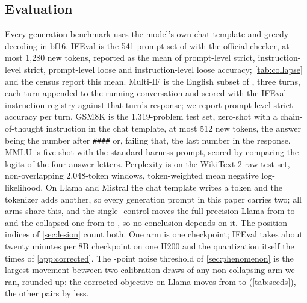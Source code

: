\subsection{Evaluation}
Every generation benchmark uses the model's own chat template and greedy decoding in bf16.
IFEval is the 541-prompt set of \citet{zhou2023ifeval} with the official checker, at most 1,280 new tokens, reported as the mean of prompt-level strict, instruction-level strict, prompt-level loose and instruction-level loose accuracy; \cref{tab:collapse} and the census report this mean.
Multi-IF is the English subset of \citet{he2024multiif}, three turns, each turn appended to the running conversation and scored with the IFEval instruction registry against that turn's response; we report prompt-level strict accuracy per turn.
GSM8K is the 1,319-problem test set, zero-shot with a chain-of-thought instruction in the chat template, at most 512 new tokens, the answer being the number after \texttt{\#\#\#\#} or, failing that, the last number in the response.
MMLU is five-shot with the standard harness prompt, scored by comparing the logits of the four answer letters.
Perplexity is on the WikiText-2 raw test set, non-overlapping 2,048-token windows, token-weighted mean negative log-likelihood.
On Llama and Mistral the chat template writes a \bos{} token and the tokenizer adds another, so every generation prompt in this paper carries two; all arms share this, and the single-\bos{} control moves the full-precision Llama from \LfpIF{} to \LfpOneBosIF{} and the collapsed one from \LgptqIF{} to \LgptqOneBosIF{}, so no conclusion depends on it. The position indices of \cref{sec:lesion} count both.
One arm is one checkpoint; IFEval takes about twenty minutes per 8B checkpoint on one H200 and the quantization itself the times of \cref{app:corrected}.
The \SeedNoise{}-point noise threshold of \cref{sec:phenomenon} is the largest movement between two calibration draws of any non-collapsing arm we ran, rounded up: the corrected objective on Llama moves from \LcorrIF{} to \LcorrSeedIF{} (\cref{tab:seeds}), the other pairs by less.

